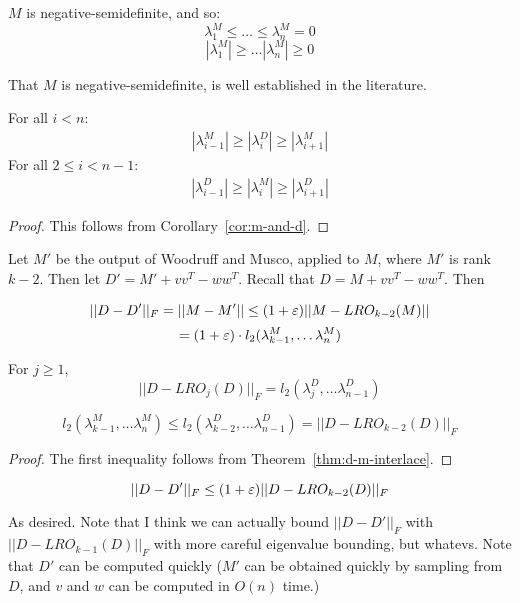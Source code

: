 \begin{theorem}
$M$ is negative-semidefinite, and so:
\[\lambda^M_1 \leq \ldots \leq \lambda^M_{n} = 0 \]
\[|\lambda^M_1| \geq \ldots |\lambda^M_{n}| \geq 0 \]
\end{theorem}
That $M$ is negative-semidefinite, is well established in the
literature.

\begin{theorem}
\label{thm:d-m-interlace}
For all $i < n$:
\begin{align}
|\lambda^M_{i-1}| \geq |\lambda^{D}_i| \geq |\lambda^{M}_{i+1}|
\end{align}
For all $2 \leq i < n-1$:
\begin{align}
|\lambda^{D}_{i-1}| \geq |\lambda^{M}_{i}| \geq
|\lambda^{D}_{i+1}|
\end{align}
\end{theorem}

\begin{proof}
This follows from Corollary~\ref{cor:m-and-d}.
\end{proof}

\begin{theorem} Let $M'$ be the output of Woodruff and Musco, applied to
$M$, where $M'$ is rank $k-2$. Then let $D' = M' + vv^T - ww^T$. Recall that $D = M + vv^T -
ww^T$. Then

\[ || D-D' ||_F = ||M - M'|| \leq (1+\varepsilon)||M-LRO_{k-2}(M)|| \]
\[ = (1+\varepsilon) \cdot l_2(\lambda_{k-1}^M, \ldots \lambda_{n}^M) \]
\end{theorem}

\begin{theorem}
For $j \geq 1$, 
\[ ||D-LRO_j(D)||_F = l_2(\lambda_j^D, \ldots \lambda_{n-1}^D) \]
\end{theorem}

\begin{theorem}
\[ l_2(\lambda_{k-1}^M, \ldots \lambda_{n}^M) 
  \leq
  l_2(\lambda_{k-2}^D, \ldots \lambda_{n-1}^D) = ||D-LRO_{k-2}(D)||_F
  \]
\end{theorem}
\begin{proof}
The first inequality follows from Theorem~\ref{thm:d-m-interlace}.
\end{proof}

\begin{theorem}
\[ ||D-D'||_F \leq (1+\varepsilon) ||D-LRO_{k-2}(D)||_F \]
\end{theorem}
As desired. Note that I think we can actually bound $||D-D'||_F$ with
$||D-LRO_{k-1}(D)||_F$ with more careful eigenvalue bounding, but
whatevs. Note that $D'$ can be computed quickly ($M'$ can be obtained
    quickly by sampling from $D$, and $v$ and $w$ can be computed in
    $O(n)$ time.)

